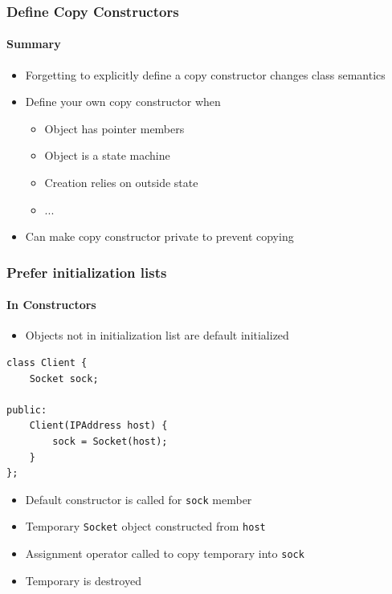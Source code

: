 \documentclass[table]{beamer}
\newcounter{rulecount}
\newcommand{\declarerule}{\textbf{\color{themeblue}{Rule \therulecount:}} }
\begin{document}
\begin{frame}[fragile]
    \frametitle{\declarerule Define Copy Constructors }
    \framesubtitle{Summary}
    \begin{itemize}
        \item Forgetting to explicitly define a copy constructor 
            changes class semantics
        \item Define your own copy constructor when
            \begin{itemize}
                \item Object has pointer members
                \item Object is a state machine
                \item Creation relies on outside state
                \item ...
            \end{itemize}
        \item Can make copy constructor private to prevent copying
    \end{itemize}
\end{frame}


\begin{frame}[fragile]
    \frametitle{\declarerule Prefer initialization lists}
    \framesubtitle{In Constructors}
    \begin{itemize}
        \item Objects not in initialization list are default initialized
    \end{itemize}
    \begin{lstlisting}[title=Assignment in constructor]
class Client {
    Socket sock;

public:
    Client(IPAddress host) {
        sock = Socket(host);
    }
};
    \end{lstlisting}
    \begin{itemize}
        \item Default constructor is called for \texttt{sock} member
        \item Temporary \texttt{Socket} object constructed from \texttt{host}
        \item Assignment operator called to copy temporary into \texttt{sock}
        \item Temporary is destroyed
    \end{itemize}
\end{frame}
\end{document}
